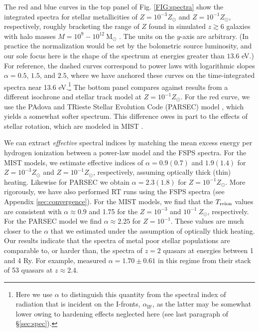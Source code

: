 \documentclass[twocolumn]{aastex62}
\newcommand{\Treion}{T_{\rm reion}}
\newcommand{\spec}{\alpha_{\mathrm{IF}}}
\begin{document}
The red and blue curves in the top panel of Fig. \ref{FIG:spectra} show the integrated spectra for stellar metallicities of $Z=10^{-3}Z_{\odot}$ and $Z=10^{-1} Z_{\odot}$, respectively, roughly bracketing the range of $Z$ found in simulated $z\gtrsim 6$ galaxies with halo masses $M =  10^9 - 10^{12}~\mathrm{M}_\odot$ \citep{2016MNRAS.456.2140M}.  The units on the $y$-axis are arbitrary. (In practice the normalization would be set by the bolometric source luminosity, and our sole focus here is the shape of the spectrum at energies greater than $13.6$ eV.) For reference, the dashed curves correspond to power laws with logarithmic slopes $\alpha = 0.5$, $1.5$, and $2.5$, where we have anchored these curves on the time-integrated spectra near 13.6 eV.\footnote{Here we use $\alpha$ to distinguish this quantity from the spectral index of radiation that is incident on the I-fronts, $\spec$, as the latter may be somewhat lower owing to hardening effects neglected here (see last paragraph of \S \ref{sec:spec}). }  The bottom panel compares against results from a different isochrone and stellar track model at $Z=10^{-1} Z_{\odot}$.  For the red curve, we use the PAdova and TRieste Stellar Evolution Code (PARSEC) model \citep{2012MNRAS.427..127B}, which yields a somewhat softer spectrum.  This difference owes in part to the effects of stellar rotation, which are modeled in MIST \citep[see][]{2017ApJ...838..159C}.     

We can extract {\it effective} spectral indices by matching the mean excess energy per hydrogen ionization between a power-law model and the FSPS spectra. For the MIST models, we estimate effective indices of $\alpha = 0.9(0.7)$ and $1.9(1.4)$ for $Z=10^{-3}Z_{\odot}$ and $Z=10^{-1} Z_{\odot}$, respectively, assuming optically thick (thin) heating. Likewise for PARSEC we obtain $\alpha= 2.3 (1.8)$ for $Z=10^{-1} Z_{\odot}$.  More rigorously, we have also performed  RT runs using the FSPS spectra (see Appendix \ref{sec:convergence}).  For the MIST models, we find that the $\Treion$ values are consistent with $\alpha \approx 0.9$ and 1.75 for the $Z=10^{-3}$ and $10^{-1}~Z_{\odot}$, respectively. For the PARSEC model we find $\alpha \approx 2.25$ for $Z=10^{-1}$.  These values are much closer to the $\alpha$ that we estimated under the assumption of optically thick heating.  Our results indicate that the spectra of metal poor stellar populations are comparable to, or harder than, the spectra of $z=2$ quasars at energies between 1 and 4 Ry. For example, \citet{2015MNRAS.449.4204L} measured $\alpha = 1.70\pm 0.61$ in this regime from their stack of 53 quasars at $z\approx2.4$.  
\end{document}
